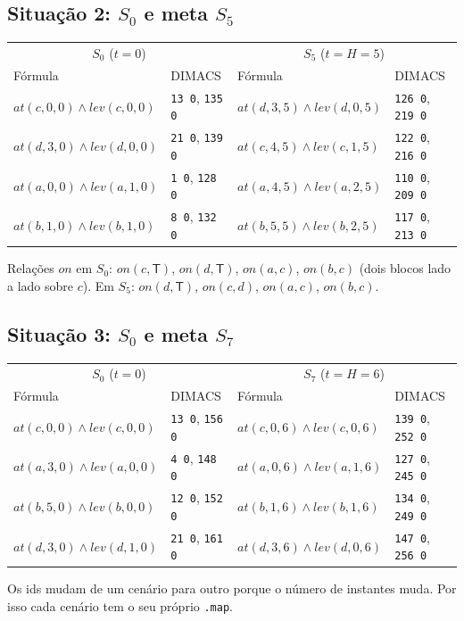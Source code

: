 \documentclass[11pt,a4paper]{article}
\newcommand{\at}{\mathit{at}}
\newcommand{\lev}{\mathit{lev}}
\newcommand{\on}{\mathit{on}}
\newcommand{\mesaT}{\mathsf{T}}
\begin{document}
\subsection{Situação 2: \texorpdfstring{$S_0$}{S0} e meta \texorpdfstring{$S_5$}{S5}}
\begin{center}\small
\begin{tabular}{@{}ll|ll@{}}
\toprule
\multicolumn{2}{c|}{$S_0$ ($t=0$)} & \multicolumn{2}{c}{$S_5$ ($t=H=5$)}\\
Fórmula & DIMACS & Fórmula & DIMACS\\
\midrule
$\at(c,0,0)\land\lev(c,0,0)$ & \texttt{13 0}, \texttt{135 0} & $\at(d,3,5)\land\lev(d,0,5)$ & \texttt{126 0}, \texttt{219 0}\\
$\at(d,3,0)\land\lev(d,0,0)$ & \texttt{21 0}, \texttt{139 0} & $\at(c,4,5)\land\lev(c,1,5)$ & \texttt{122 0}, \texttt{216 0}\\
$\at(a,0,0)\land\lev(a,1,0)$ & \texttt{1 0}, \texttt{128 0} & $\at(a,4,5)\land\lev(a,2,5)$ & \texttt{110 0}, \texttt{209 0}\\
$\at(b,1,0)\land\lev(b,1,0)$ & \texttt{8 0}, \texttt{132 0} & $\at(b,5,5)\land\lev(b,2,5)$ & \texttt{117 0}, \texttt{213 0}\\
\bottomrule
\end{tabular}
\end{center}
Relações $\on$ em $S_0$: $\on(c,\mesaT)$, $\on(d,\mesaT)$, $\on(a,c)$, $\on(b,c)$
(dois blocos lado a lado sobre $c$). Em $S_5$: $\on(d,\mesaT)$, $\on(c,d)$,
$\on(a,c)$, $\on(b,c)$.

\subsection{Situação 3: \texorpdfstring{$S_0$}{S0} e meta \texorpdfstring{$S_7$}{S7}}
\begin{center}\small
\begin{tabular}{@{}ll|ll@{}}
\toprule
\multicolumn{2}{c|}{$S_0$ ($t=0$)} & \multicolumn{2}{c}{$S_7$ ($t=H=6$)}\\
Fórmula & DIMACS & Fórmula & DIMACS\\
\midrule
$\at(c,0,0)\land\lev(c,0,0)$ & \texttt{13 0}, \texttt{156 0} & $\at(c,0,6)\land\lev(c,0,6)$ & \texttt{139 0}, \texttt{252 0}\\
$\at(a,3,0)\land\lev(a,0,0)$ & \texttt{4 0}, \texttt{148 0} & $\at(a,0,6)\land\lev(a,1,6)$ & \texttt{127 0}, \texttt{245 0}\\
$\at(b,5,0)\land\lev(b,0,0)$ & \texttt{12 0}, \texttt{152 0} & $\at(b,1,6)\land\lev(b,1,6)$ & \texttt{134 0}, \texttt{249 0}\\
$\at(d,3,0)\land\lev(d,1,0)$ & \texttt{21 0}, \texttt{161 0} & $\at(d,3,6)\land\lev(d,0,6)$ & \texttt{147 0}, \texttt{256 0}\\
\bottomrule
\end{tabular}
\end{center}
Os ids mudam de um cenário para outro porque o número de instantes muda. Por isso
cada cenário tem o seu próprio \texttt{.map}.
\end{document}
